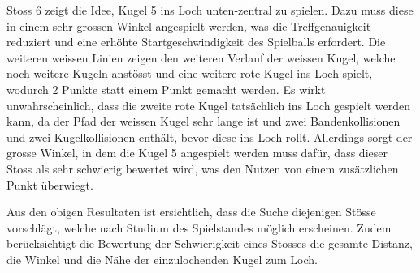 Stoss 6 zeigt die Idee, Kugel 5 ins Loch unten-zentral zu spielen.
Dazu muss diese in einem sehr grossen Winkel angespielt werden, was die Treffgenauigkeit reduziert und eine
erhöhte Startgeschwindigkeit des Spielballs erfordert.
Die weiteren weissen Linien zeigen den weiteren Verlauf der weissen Kugel, welche noch weitere Kugeln anstösst und
eine weitere rote Kugel ins Loch spielt, wodurch 2 Punkte statt einem Punkt gemacht werden.
Es wirkt unwahrscheinlich, dass die zweite rote Kugel tatsächlich ins Loch gespielt werden kann, da der Pfad der weissen Kugel
sehr lange ist und zwei Bandenkollisionen und zwei Kugelkollisionen enthält, bevor diese ins Loch rollt.
Allerdings sorgt der grosse Winkel, in dem die Kugel 5 angespielt werden muss dafür, dass dieser Stoss als sehr schwierig
bewertet wird, was den Nutzen von einem zusätzlichen Punkt überwiegt.

Aus den obigen Resultaten ist ersichtlich, dass die Suche diejenigen Stösse vorschlägt, welche nach Studium des Spielstandes
möglich erscheinen. Zudem berücksichtigt die Bewertung der Schwierigkeit eines Stosses die gesamte Distanz, die Winkel und die Nähe
der einzulochenden Kugel zum Loch.




%
%



